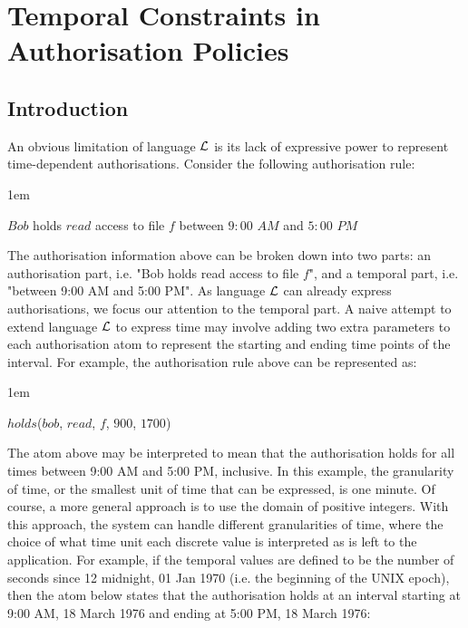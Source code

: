 \documentclass[11pt]{report}
\newenvironment{vquote}
{
  \begin{list}{}{\leftmargin 1em}\item[]
}
{
  \end{list}
}
\begin{document}
  \onehalfspacing

  \chapter{Temporal Constraints in Authorisation Policies}

    \section{Introduction}

      An obvious limitation of language ${\cal L}$ is its lack of expressive
      power to represent time-dependent authorisations. Consider the following
      authorisation rule:

      \begin{vquote}
        $Bob$ holds $read$ access to file $f$ between $9:00$ $AM$ and $5:00$
        $PM$
      \end{vquote}

      The authorisation information above can be broken down into two parts: an
      authorisation part, i.e. "Bob holds read access to file $f$", and a
      temporal part, i.e. "between 9:00 AM and 5:00 PM". As language ${\cal L}$
      can already express authorisations, we focus our attention to the
      temporal part. A naive attempt to extend language ${\cal L}$ to express
      time may involve adding two extra parameters to each authorisation atom
      to represent the starting and ending time points of the interval. For
      example, the authorisation rule above can be represented as:

      \begin{vquote}
        $holds$($bob$, $read$, $f$, $900$, $1700$)
      \end{vquote}

      The atom above may be interpreted to mean that the authorisation holds
      for all times between 9:00 AM and 5:00 PM, inclusive. In this example,
      the granularity of time, or the smallest unit of time that can be
      expressed, is one minute. Of course, a more general approach is to use
      the domain of positive integers. With this approach, the system can
      handle different granularities of time, where the choice of what time
      unit each discrete value is interpreted as is left to the application.
      For example, if the temporal values are defined to be the number of
      seconds since 12 midnight, 01 Jan 1970 (i.e. the beginning of the UNIX
      epoch), then the atom below states that the authorisation holds at an
      interval starting at 9:00 AM, 18 March 1976 and ending at 5:00 PM, 18
      March 1976:
\end{document}
